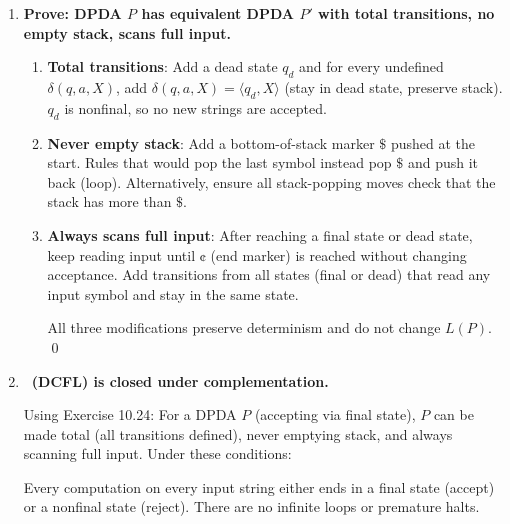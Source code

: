 \begin{enumerate}[{10.}1. ]
\textbf{Step}: If the product machine takes $k+1$ moves from $\langle\langle s_1,s_2\rangle,xy,\alpha\rangle$: the first move reads some $a$ (or $\lambda$) and moves to $\langle\langle s_1',s_2'\rangle,\cdot,\cdot\rangle$. In the product machine, this corresponds to a joint transition: $P_1$ moves from $s_1$ and $A_2$ reads $a$ to move from $s_2$. By IH on $k$ moves, the remaining computation in the product machine corresponds to $P^{\cap}$ and $\DBAR_2$. The $A_2$ component is precisely $\DBAR_2(s_2,x)$ after reading $x$. \qed

\item \textbf{Prove: DPDA $P$ has equivalent DPDA $P'$ with total transitions, no empty stack, scans full input.}

\begin{enumerate}
\item \textbf{Total transitions}: Add a dead state $q_d$ and for every undefined $\delta(q,a,X)$, add $\delta(q,a,X) = \langle q_d, X\rangle$ (stay in dead state, preserve stack). $q_d$ is nonfinal, so no new strings are accepted.

\item \textbf{Never empty stack}: Add a bottom-of-stack marker $\pmb{\$}$ pushed at the start. Rules that would pop the last symbol instead pop $\pmb{\$}$ and push it back (loop). Alternatively, ensure all stack-popping moves check that the stack has more than $\pmb{\$}$.

\item \textbf{Always scans full input}: After reaching a final state or dead state, keep reading input until $\pmb{\cent}$ (end marker) is reached without changing acceptance. Add transitions from all states (final or dead) that read any input symbol and stay in the same state.

All three modifications preserve determinism and do not change $L(P)$. \qed
\end{enumerate}

\item \textbf{\ASIG\ (DCFL) is closed under complementation.}

Using Exercise 10.24: For a DPDA $P$ (accepting via final state), $P$ can be made total (all transitions defined), never emptying stack, and always scanning full input. Under these conditions:

Every computation on every input string either ends in a final state (accept) or a nonfinal state (reject). There are no infinite loops or premature halts.


\end{enumerate}
